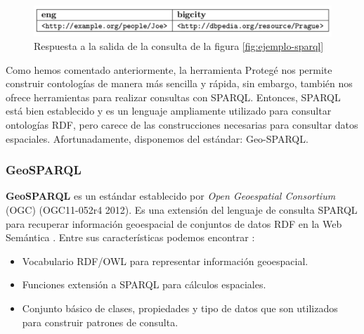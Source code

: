 \begin{figure}[H]
	\centering
	\includegraphics[width=0.9\linewidth]{imagenes/capitulo3/salida-sparql}
	\caption{Respuesta a la salida de la consulta de la figura \ref{fig:ejemplo-sparql}}
	\label{fig:salida-sparql}
\end{figure}



Como hemos comentado anteriormente, la herramienta Protegé nos permite construir contologías de manera más sencilla y rápida, sin embargo, también nos ofrece herramientas para realizar consultas con SPARQL. Entonces, SPARQL está bien establecido y es un lenguaje ampliamente utilizado para consultar ontologías RDF, pero carece de las construcciones necesarias para consultar datos espaciales. Afortunadamente, disponemos del estándar: Geo-SPARQL.

\subsubsection{GeoSPARQL}

\textbf{GeoSPARQL} es un estándar establecido por \textit{Open Geoespatial Consortium} (OGC) (OGC11-052r4 2012). Es una extensión del lenguaje de consulta SPARQL para recuperar información geoespacial de conjuntos de datos RDF en la Web Semántica \cite{libro-gis}. Entre sus características podemos encontrar \cite{tesis}: 

\begin{itemize}
	\item Vocabulario RDF/OWL para representar información geoespacial.
	\item Funciones extensión a SPARQL para cálculos espaciales.
	\item Conjunto básico de clases, propiedades y tipo de datos que son utilizados para construir patrones de consulta. 
\end{itemize}


